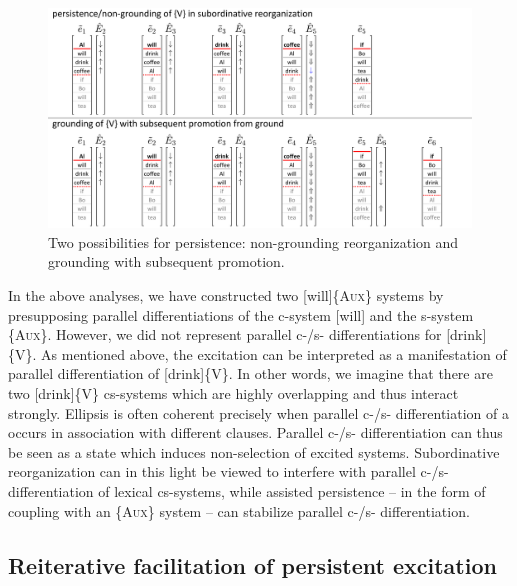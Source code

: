   
\begin{figure}
\includegraphics[width=\textwidth]{figures/Tilsen-img149.png}
\caption{Two possibilities for persistence: non-grounding reorganization and grounding with subsequent promotion.}
\label{fig:7:5}
\end{figure}
 

  In the above analyses, we have constructed two [will]\{A\textsc{ux}\} systems by presupposing parallel differentiations of the c-system [will] and the s-system \{A\textsc{ux}\}. However, we did not represent parallel c-/s- differentiations for [drink]\{V\}. As mentioned above, the excitation  can be interpreted as a manifestation of parallel differentiation of [drink]\{V\}. In other words, we imagine that there are two [drink]\{V\} cs-systems which are highly overlapping and thus interact strongly. Ellipsis is often coherent precisely when parallel c-/s- differentiation of a  occurs in association with different clauses. Parallel c-/s- differentiation can thus be seen as a state which induces non-selection of excited systems. Subordinative reorganization can in this light be viewed to interfere with parallel c-/s- differentiation of lexical cs-systems, while assisted persistence -- in the form of coupling with an \{A\textsc{ux}\} system -- can stabilize parallel c-/s- differentiation.

\subsection{Reiterative facilitation of persistent excitation}

